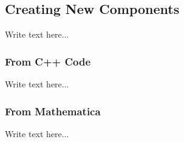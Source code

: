 
\subsection{Creating New Components}
Write text here...

\subsubsection{From C++ Code}
Write text here...

\subsubsection{From Mathematica}
Write text here...

